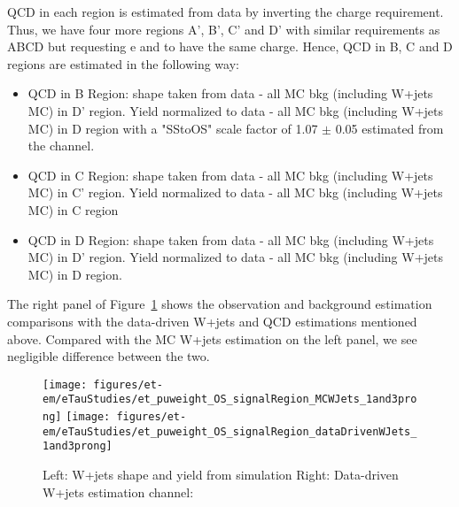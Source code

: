 QCD in each region is estimated from data by inverting the charge
requirement.  Thus, we have four more regions A', B', C' and D' with
similar requirements as ABCD but requesting e and \tauh to have the
same charge. Hence, QCD in B, C and D regions are estimated in the
following way:
\begin{itemize}
  \item QCD in B Region: shape taken from data - all MC bkg (including W+jets MC) in D' region. 
Yield normalized to data - all MC bkg (including W+jets MC) in D region with a "SStoOS" scale 
factor of 1.07 $\pm$ 0.05 estimated from the \thth channel.
  \item QCD in C Region: shape taken from data - all MC bkg (including W+jets MC) in C' region. 
Yield normalized to data - all MC bkg (including W+jets MC) in C region
  \item QCD in D Region: shape taken from data - all MC bkg (including W+jets MC) in D' region. 
Yield normalized to data - all MC bkg (including W+jets MC) in D region.
\end{itemize}

The right panel of Figure~\ref{fig:dataDrivenWJets} shows the observation and background 
estimation comparisons with the data-driven W+jets and QCD estimations mentioned above. Compared 
with the MC W+jets estimation on the left panel, we see negligible difference between the 
two.

\begin{figure}\centering
  \texttt{[image: figures/et-em/eTauStudies/et\_puweight\_OS\_signalRegion\_MCWJets\_1and3prong]}
  \texttt{[image: figures/et-em/eTauStudies/et\_puweight\_OS\_signalRegion\_dataDrivenWJets\_1and3prong]}
  \caption{\label{fig:dataDrivenWJets} Left: W+jets shape and yield from simulation
    Right: Data-driven W+jets estimation \teth
    channel: \meffetau}
\end{figure}
